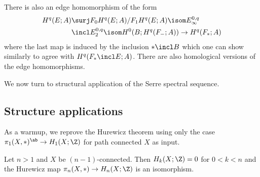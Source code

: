 There is also an edge homomorphism of the form
\begin{align*}
	H^q(E; A) &\surj F_0 H^q(E; A) / F_1 H^q(E; A) \isom E_\infty^{0, q} \\
			  &\incl E_2^{0, q} \isom H^0(B; H^q(F_{-}; A)) \to H^q(F_*; A)
\end{align*}
where the last map is induced by the inclusion $* \incl B$ which one can show similarly to agree with $H^q(F_* \incl E; A)$.
There are also homological versions of the edge homomorphisms.

We now turn to structural application of the Serre spectral sequence.

\subsection{Structure applications}
As a warmup, we reprove the Hurewicz theorem using only the case $\pi_1(X, *)^\ab \to H_1(X; \Z)$ for path connected $X$ as input.
\begin{proposition}[Hurewicz]
	Let $n > 1$ and $X$ be $(n - 1)$-connected.
	Then $H_k(X; \Z) = 0$ for $0 < k < n$ and the Hurewicz map $\pi_n(X, *) \to H_n(X; \Z)$ is an isomorphism.
\end{proposition}
